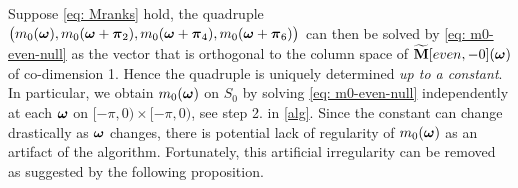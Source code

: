 Suppose \eqref{eq: Mranks} hold, the quadruple  $\big( m_0(\boldsymbol{\omega}),m_0(\boldsymbol{\omega}+\boldsymbol{\pi}_2), m_0(\boldsymbol{\omega} +\boldsymbol{\pi}_4), m_0(\boldsymbol{\omega}+\boldsymbol{\pi}_6) \big)$ can then be solved by \eqref{eq: m0-even-null} as the vector that is orthogonal to the column space of $\widetilde{\mathbf{M}}[even,-0](\boldsymbol{\omega})$ of co-dimension 1. Hence the quadruple is uniquely determined {\it up to a constant}. In particular, we obtain $m_0(\boldsymbol{\omega})$ on $S_0$ by solving \eqref{eq: m0-even-null} independently at each $\boldsymbol{\omega}$ on $[-\pi,0)\times[-\pi,0)$, see step 2. in \ref{alg}. Since the constant can change drastically as $\boldsymbol{\omega}$ changes, there is potential lack of regularity of $m_0(\boldsymbol{\omega})$ as an artifact of the algorithm. Fortunately, this artificial irregularity can be removed as suggested by the following proposition.

\begin{comment}
By Lemma \ref{lem: M-symmetry}, $\M[:,-0]$ are the same at $\V{\omega},\V{\omega}+\V{\pi}_2,\V{\omega}+\V{\pi}_4$ and $\V{\omega} + \V{\pi}_6$ up to row permutations. Therefore, the columns of the matrix $\V{B}$ below should be in $col\big(\M[:,-0](\V{\omega})\big)$,
\begin{align*}
\V{B}&= \widetilde{\mathbf{m}_0}^\uparrow\otimes\mathbf{m}_0 - [\V{b}_0,\V{b}_2,\V{b}_4,\V{b}_6]\\
&\doteq
\begin{bmatrix}
 \overline{\widetilde{m_0}}(\V{\omega})\\
 0\\
\sbarmp{0}{2}\\
0\\
\sbarmp{0}{4}\\
0\\
\sbarmp{0}{6}\\
0
\end{bmatrix}
\otimes
\begin{bmatrix}
 m_0(\V{\omega})\\
 m_0(\V{\omega} + \V{\pi}_2)\\
 m_0(\V{\omega} + \V{\pi}_4)\\
 m_0(\V{\omega} + \V{\pi}_6) 
\end{bmatrix}
-
\begin{bmatrix}
1 & 0 & 0 & 0\\
0 & 0 & 0 & 0\\
0 & 1 & 0 & 0\\
0 & 0 & 0 & 0\\
0 & 0 & 1 & 0\\
0 & 0 & 0 & 0\\
0 & 0 & 0 & 1\\
0 & 0 & 0 & 0
\end{bmatrix},
\end{align*}


\end{comment}
